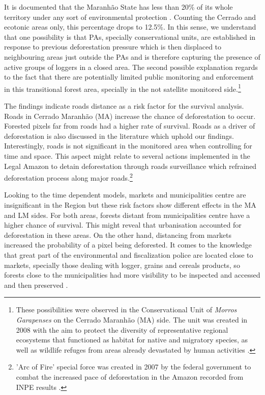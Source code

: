 It is documented that the Maranhão State has less than 20\% of its whole territory under any sort of environmental protection \citep{SPINELLI_2016}. Counting the Cerrado and ecotonic areas only, this percentage drops to 12.5\%. In this sense, we understand that one possibility is that PAs, specially conservational units, are established in response to previous deforestation pressure which is then displaced to neighbouring areas just outside the PAs and is therefore capturing the presence of active groups of loggers in a closed area. The second possible explanation regards to the fact that there are potentially limited public monitoring and enforcement in this transitional forest area, specially in the not satellite monitored side.\footnote{These possibilities were observed in the Conservational Unit of \textit{Morros Garapenses} on the Cerrado Maranhão (MA) side. The unit was created in 2008 with the aim to protect the diversity of representative regional ecosystems that functioned as habitat for native and migratory species, as well as wildlife refuges from areas already devastated by human activities \citep{isa_2018}.}  

The findings indicate roads distance as a risk factor for the survival analysis. Roads in Cerrado Maranhão (MA) increase the chance of deforestation to occur. Forested pixels far from roads had a higher rate of survival. Roads as a driver of deforestation is also discussed in the literature \citep{CROPPER2, CROPPER1, PFAFF3, BAYNARD} which uphold our findings. Interestingly, roads is not significant in the monitored area when controlling for time and space. This aspect might relate to several actions implemented in the Legal Amazon to detain deforestation through roads surveillance which refrained deforestation process along major roads.\footnote{'Arc of Fire' special force was created in 2007 by the federal government to combat the increased pace of deforestation in the Amazon recorded from INPE results \citep{PF_arcodofogo,inpe-deter_2018}.} 

Looking to the time dependent models, markets and municipalities centre are insignificant in the Region but these risk factors show different effects in the MA and LM sides. For both areas, forests distant from municipalities centre have a higher chance of survival. This might reveal that urbanisation accounted for deforestation in these areas. On the other hand, distancing from markets increased the probability of a pixel being deforested. It comes to the knowledge that great part of the environmental and fiscalization police are located close to markets, specially those dealing with logger, grains and cereals products, so forests close to the municipalities had more visibility to be inspected and accessed and then preserved \citep{rural_2018}.

